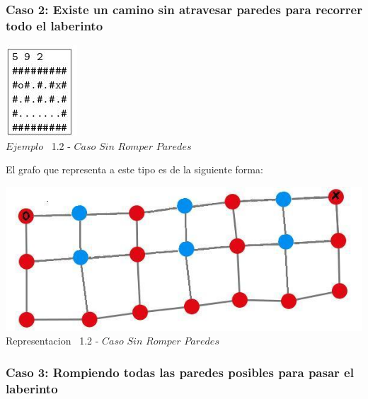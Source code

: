  \begin{center}
 \subsubsection*{Caso 2: Existe un camino sin atravesar paredes para recorrer todo el laberinto}
\end{center}
 
\vspace*{0.3cm} \vspace*{0.3cm}
  \begin{center}
 \includegraphics[scale=1.6]{./EJ1/ej1solucionsinpared.jpeg}
 \\{$Ejemplo$ \ 1.2 - $Caso$ $Sin$ $Romper$ $Paredes$}
  \end{center}
  \vspace*{0.3cm}

El grafo que representa a este tipo es de la siguiente forma:\\

\vspace*{0.3cm} \vspace*{0.3cm}
  \begin{center}
 \includegraphics[scale=0.5]{./EJ1/ej1grafosolucionsinpared.jpeg}
 \\{Representacion \ 1.2 - $Caso$ $Sin$ $Romper$ $Paredes$}
  \end{center}
  \vspace*{0.3cm}

  
\begin{center}
 \subsubsection*{Caso 3: Rompiendo todas las paredes posibles para pasar el laberinto}
\end{center}
 
